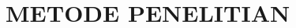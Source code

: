 \vspace{1.5pc}
\vspace{1.5pc}
\section[Metode Penelitian]{METODE PENELITIAN}
\begin{spacing}{1.5}
	
	\lipsum[1-4]
	
\end{spacing}